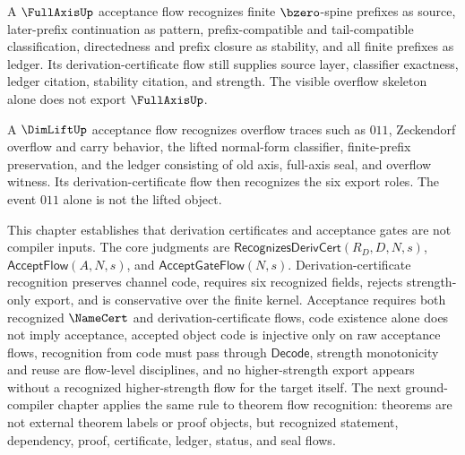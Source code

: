 \begin{example}
\label{ex:derivcert-generated-fullaxis-acceptance-flow}
A $\FullAxisUp$ acceptance flow recognizes finite $\bzero$-spine prefixes as source, later-prefix continuation as pattern, prefix-compatible and tail-compatible classification, directedness and prefix closure as stability, and all finite prefixes as ledger. Its derivation-certificate flow still supplies source layer, classifier exactness, ledger citation, stability citation, and strength. The visible overflow skeleton alone does not export $\FullAxisUp$.
\end{example}

\begin{example}
\label{ex:derivcert-generated-dimlift-acceptance-flow}
A $\DimLiftUp$ acceptance flow recognizes overflow traces such as $011$, Zeckendorf overflow and carry behavior, the lifted normal-form classifier, finite-prefix preservation, and the ledger consisting of old axis, full-axis seal, and overflow witness. Its derivation-certificate flow then recognizes the six export roles. The event $011$ alone is not the lifted object.
\end{example}

\begin{remark}[Outlook]
\label{rem:derivcert-generated-outlook}
This chapter establishes that derivation certificates and acceptance gates are not compiler inputs. The core judgments are $\mathsf{RecognizesDerivCert}(R_D,D,N,s)$, $\mathsf{AcceptFlow}(A,N,s)$, and $\mathsf{AcceptGateFlow}(N,s)$. Derivation-certificate recognition preserves channel code, requires six recognized fields, rejects strength-only export, and is conservative over the finite kernel. Acceptance requires both recognized $\NameCert$ and derivation-certificate flows, code existence alone does not imply acceptance, accepted object code is injective only on raw acceptance flows, recognition from code must pass through $\mathsf{Decode}$, strength monotonicity and reuse are flow-level disciplines, and no higher-strength export appears without a recognized higher-strength flow for the target itself. The next ground-compiler chapter applies the same rule to theorem flow recognition: theorems are not external theorem labels or proof objects, but recognized statement, dependency, proof, certificate, ledger, status, and seal flows.
\end{remark}
